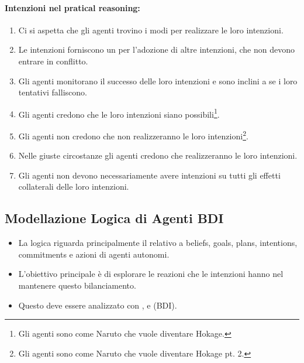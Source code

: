 \paragraph{Intenzioni nel pratical reasoning:}

\begin{enumerate}
  \item Ci si aspetta che gli agenti trovino i modi per realizzare le loro intenzioni. 
  \item Le intenzioni forniscono un  per l'adozione di altre intenzioni, che non devono entrare in conflitto. 
  \item Gli agenti monitorano il successo delle loro intenzioni e sono inclini a  se i loro tentativi falliscono. 
  \item  Gli agenti credono che le loro intenzioni siano possibili\footnote{Gli agenti sono come Naruto che vuole diventare Hokage.}. 
  \item Gli agenti non credono che non realizzeranno le loro intenzioni\footnote{Gli agenti sono come Naruto che vuole diventare Hokage pt. 2.}. 
  \item Nelle giuste circostanze gli agenti credono che realizzeranno le loro intenzioni. 
  \item Gli agenti non devono necessariamente avere intenzioni su tutti gli effetti collaterali delle loro intenzioni.
\end{enumerate}


\subsection{Modellazione Logica di Agenti BDI}

\begin{itemize}
  \item La logica riguarda principalmente il  relativo a beliefs, goals, plans, intentions, commitments e azioni di agenti autonomi. 
  \item L'obiettivo principale è di esplorare le reazioni che le intenzioni hanno nel mantenere questo bilanciamento. 
  \item Questo deve essere analizzato con ,  e  (BDI).
\end{itemize}

